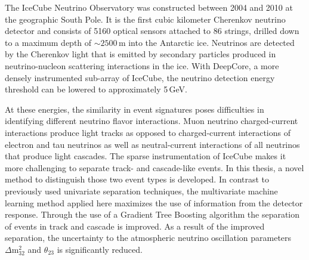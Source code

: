 The IceCube Neutrino Observatory  was constructed between 2004 and 2010 at the geographic South Pole.
It is the first cubic kilometer Cherenkov neutrino detector and consists of 5160 optical sensors attached to 86 strings, drilled down to a maximum depth of $\sim2500$\,m into the Antarctic ice.
Neutrinos are detected by the Cherenkov light that is emitted by secondary particles produced in neutrino-nucleon scattering interactions in the ice.
With DeepCore, a more densely instrumented sub-array of IceCube, the neutrino detection energy threshold can be lowered to approximately 5\,GeV.

At these energies, the similarity in event signatures poses difficulties in identifying different neutrino flavor interactions.
Muon neutrino charged-current interactions produce light tracks as opposed to charged-current interactions of electron and tau neutrinos as well as neutral-current interactions of all neutrinos that produce light cascades.
The sparse instrumentation of IceCube makes it more challenging to separate track- and cascade-like events.
In this thesis, a novel method to distinguish those two event types is developed.
In contrast to previously used univariate separation techniques, the multivariate machine learning method applied here maximizes the use of information from the detector response.
Through the use of a Gradient Tree Boosting algorithm the separation of events in track and cascade is improved.
As a result of the improved separation, the uncertainty to the atmospheric neutrino oscillation parameters $\Delta \mathrm{m}^{2}_{32}$ and $\theta_{23}$ is significantly reduced.

